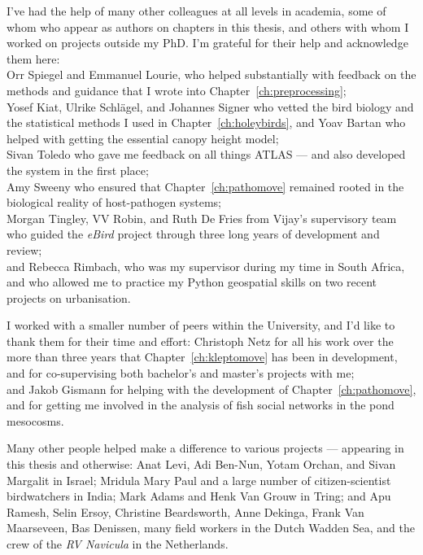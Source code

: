 \noindent I've had the help of many other colleagues at all levels in academia, some of whom who appear as authors on chapters in this thesis, and others with whom I worked on projects outside my PhD.
I'm grateful for their help and acknowledge them here:\\
Orr Spiegel and Emmanuel Lourie, who helped substantially with feedback on the methods and guidance that I wrote into Chapter~\ref{ch:preprocessing};\\
Yosef Kiat, Ulrike Schl{\"a}gel, and Johannes Signer who vetted the bird biology and the statistical methods I used in Chapter~\ref{ch:holeybirds}, and Yoav Bartan who helped with getting the essential canopy height model;\\
Sivan Toledo who gave me feedback on all things ATLAS --- and also developed the system in the first place;\\
Amy Sweeny who ensured that Chapter~\ref{ch:pathomove} remained rooted in the biological reality of host-pathogen systems;\\
Morgan Tingley, VV Robin, and Ruth De Fries from Vijay's supervisory team who guided the \textit{eBird} project through three long years of development and review;\\
and Rebecca Rimbach, who was my supervisor during my time in South Africa, and who allowed me to practice my Python geospatial skills on two recent projects on urbanisation.

I worked with a smaller number of peers within the University, and I'd like to thank them for their time and effort:
Christoph Netz for all his work over the more than three years that Chapter~\ref{ch:kleptomove} has been in development, and for co-supervising both bachelor's and master's projects with me;\\
and Jakob Gismann for helping with the development of Chapter~\ref{ch:pathomove}, and for getting me involved in the analysis of fish social networks in the pond mesocosms.

Many other people helped make a difference to various projects --- appearing in this thesis and otherwise: Anat Levi, Adi Ben-Nun, Yotam Orchan, and Sivan Margalit in Israel; Mridula Mary Paul and a large number of citizen-scientist birdwatchers in India; Mark Adams and Henk Van Grouw in Tring; and Apu Ramesh, Selin Ersoy, Christine Beardsworth, Anne Dekinga, Frank Van Maarseveen, Bas Denissen, many field workers in the Dutch Wadden Sea, and the crew of the \textit{RV Navicula} in the Netherlands.

\medskip

